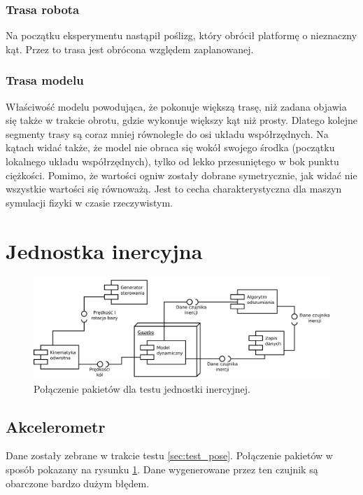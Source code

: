 	\subsubsection{Trasa robota}
		Na początku eksperymentu nastąpił poślizg, który obrócił platformę o nieznaczny kąt.
		Przez to trasa jest obrócona względem zaplanowanej.
	\subsubsection{Trasa modelu}
		Właściwość modelu powodująca, że pokonuje większą trasę, niż zadana objawia się także w trakcie obrotu, gdzie wykonuje większy kąt niż prosty.
		Dlatego kolejne segmenty trasy są coraz mniej równoległe do osi układu współrzędnych.
		Na kątach widać także, że model nie obraca się wokół swojego środka (początku lokalnego układu współrzędnych), tylko od lekko przesuniętego w bok
		punktu ciężkości. Pomimo, że wartości ogniw zostały dobrane symetrycznie, jak widać nie wszystkie wartości się równoważą.
		Jest to cecha charakterystyczna dla maszyn symulacji fizyki w czasie rzeczywistym.
		
\section{Jednostka inercyjna}
\label{sec:test_imu}
	\begin{figure}[H]
		\centering
		\includegraphics[width=\textwidth]{uml/wewucho.pdf}
		\caption{Połączenie pakietów dla testu jednostki inercyjnej.}
		\label{uml:test_imu}
	\end{figure}
	\subsection{Akcelerometr}
		Dane zostały zebrane w trakcie testu \ref{sec:test_pose}.
		Połączenie pakietów w sposób pokazany na rysunku \ref{uml:test_imu}.
		Dane wygenerowane przez ten czujnik są obarczone bardzo dużym błędem.
		
